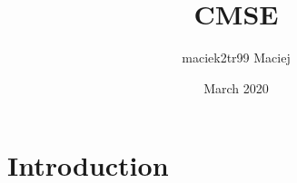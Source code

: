 \documentclass{article}
\title{CMSE}
\author{maciek2tr99 Maciej}
\date{March 2020}
\begin{document}
\maketitle

\section{Introduction}
\end{document}
